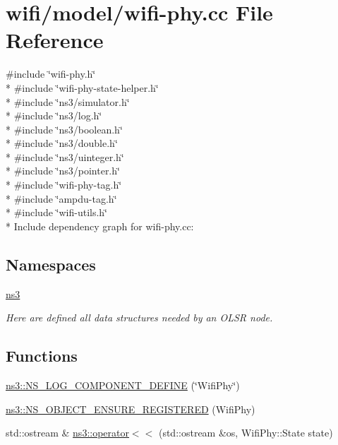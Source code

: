 \hypertarget{wifi-phy_8cc}{}\section{wifi/model/wifi-\/phy.cc File Reference}
\label{wifi-phy_8cc}
{\ttfamily \#include \char`\"{}wifi-\/phy.\+h\char`\"{}}\\*
{\ttfamily \#include \char`\"{}wifi-\/phy-\/state-\/helper.\+h\char`\"{}}\\*
{\ttfamily \#include \char`\"{}ns3/simulator.\+h\char`\"{}}\\*
{\ttfamily \#include \char`\"{}ns3/log.\+h\char`\"{}}\\*
{\ttfamily \#include \char`\"{}ns3/boolean.\+h\char`\"{}}\\*
{\ttfamily \#include \char`\"{}ns3/double.\+h\char`\"{}}\\*
{\ttfamily \#include \char`\"{}ns3/uinteger.\+h\char`\"{}}\\*
{\ttfamily \#include \char`\"{}ns3/pointer.\+h\char`\"{}}\\*
{\ttfamily \#include \char`\"{}wifi-\/phy-\/tag.\+h\char`\"{}}\\*
{\ttfamily \#include \char`\"{}ampdu-\/tag.\+h\char`\"{}}\\*
{\ttfamily \#include \char`\"{}wifi-\/utils.\+h\char`\"{}}\\*
Include dependency graph for wifi-\/phy.cc\+:
\subsection*{Namespaces}
\begin{DoxyCompactItemize}
\item 
 \hyperlink{namespacens3}{ns3}
\begin{DoxyCompactList}\small\item\em Here are defined all data structures needed by an O\+L\+SR node. \end{DoxyCompactList}\end{DoxyCompactItemize}
\subsection*{Functions}
\begin{DoxyCompactItemize}
\item 
\hyperlink{namespacens3_a3149a20da4185164c42d1e9131ac8a9a}{ns3\+::\+N\+S\+\_\+\+L\+O\+G\+\_\+\+C\+O\+M\+P\+O\+N\+E\+N\+T\+\_\+\+D\+E\+F\+I\+NE} (\char`\"{}Wifi\+Phy\char`\"{})
\item 
\hyperlink{namespacens3_ac9f1e253f8d8be571cd68a5009494e74}{ns3\+::\+N\+S\+\_\+\+O\+B\+J\+E\+C\+T\+\_\+\+E\+N\+S\+U\+R\+E\+\_\+\+R\+E\+G\+I\+S\+T\+E\+R\+ED} (Wifi\+Phy)
\item 
std\+::ostream \& \hyperlink{namespacens3_ae18ddf3b1710eb0457373ad6b369c19e}{ns3\+::operator$<$$<$} (std\+::ostream \&os, Wifi\+Phy\+::\+State state)
\end{DoxyCompactItemize}
